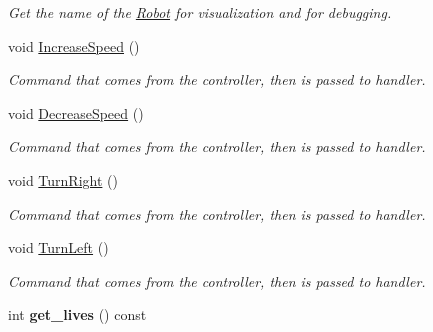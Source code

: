 \begin{DoxyCompactItemize}
\begin{DoxyCompactList}\small\item\em Get the name of the \hyperlink{classRobot}{Robot} for visualization and for debugging. \end{DoxyCompactList}\item 
void \hyperlink{classRobot_ae4647cccd002ca13659017e634237ead}{Increase\+Speed} ()\hypertarget{classRobot_ae4647cccd002ca13659017e634237ead}{}\label{classRobot_ae4647cccd002ca13659017e634237ead}

\begin{DoxyCompactList}\small\item\em Command that comes from the controller, then is passed to handler. \end{DoxyCompactList}\item 
void \hyperlink{classRobot_a94afa6f63eb22667261c07933faae481}{Decrease\+Speed} ()\hypertarget{classRobot_a94afa6f63eb22667261c07933faae481}{}\label{classRobot_a94afa6f63eb22667261c07933faae481}

\begin{DoxyCompactList}\small\item\em Command that comes from the controller, then is passed to handler. \end{DoxyCompactList}\item 
void \hyperlink{classRobot_a12b5883779f682c66e71bc54b6539694}{Turn\+Right} ()\hypertarget{classRobot_a12b5883779f682c66e71bc54b6539694}{}\label{classRobot_a12b5883779f682c66e71bc54b6539694}

\begin{DoxyCompactList}\small\item\em Command that comes from the controller, then is passed to handler. \end{DoxyCompactList}\item 
void \hyperlink{classRobot_ad864d21d997dbadf55f997c2f0143d41}{Turn\+Left} ()\hypertarget{classRobot_ad864d21d997dbadf55f997c2f0143d41}{}\label{classRobot_ad864d21d997dbadf55f997c2f0143d41}

\begin{DoxyCompactList}\small\item\em Command that comes from the controller, then is passed to handler. \end{DoxyCompactList}\item 
int {\bfseries get\+\_\+lives} () const \hypertarget{classRobot_a201302eeb10756e9f9a54de414efef08}{}\label{classRobot_a201302eeb10756e9f9a54de414efef08}


\end{DoxyCompactItemize}
